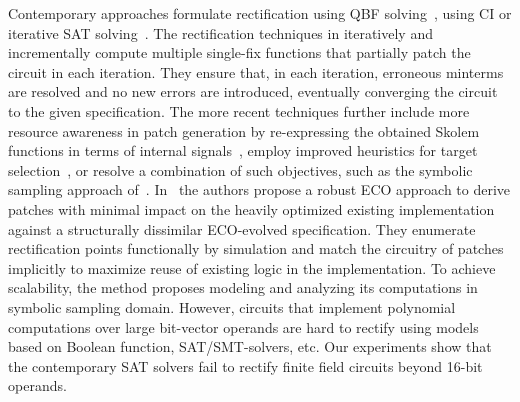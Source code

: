 Contemporary approaches formulate rectification
using QBF solving~\cite{scholl:2}, using CI or iterative SAT
solving~\cite{MF_Roland:ICCAD10,MF_Huang:DATE12}.  
The rectification techniques in 
\cite{fujita:2015,SS_Fujita:ISCAS19,MF_Huang:DATE12,SS_Roland:DAC18} 
iteratively and incrementally compute multiple single-fix functions
that partially patch the circuit in each iteration.
{\red They ensure that, in each iteration, erroneous minterms are resolved
and no new errors are introduced, eventually converging the circuit
to the given specification.}
The more recent techniques further
include more resource awareness in patch generation by re-expressing the obtained Skolem functions 
in terms of internal signals~\cite{SS_Alan:DAC18}, employ improved heuristics for
target selection~\cite{SS_Fujita:ISCAS19}, or resolve a combination of
such objectives, such as the symbolic sampling approach of~\cite{SS_Roland:DAC19}.
{\red In~\cite{SS_Roland:DAC19} the authors propose a robust ECO approach to derive 
patches with minimal impact on the heavily optimized existing implementation 
against a structurally dissimilar ECO-evolved specification. 
They enumerate rectification points 
functionally by simulation and match the circuitry of patches implicitly 
to maximize reuse of existing logic in the implementation. To achieve 
scalability, the method proposes modeling and analyzing its computations 
in symbolic sampling domain. However, circuits that implement polynomial 
computations over large bit-vector operands are hard to rectify using 
models based on Boolean function, SAT/SMT-solvers, etc.
Our experiments show that the contemporary SAT solvers fail to rectify 
finite field circuits beyond 16-bit operands.}


